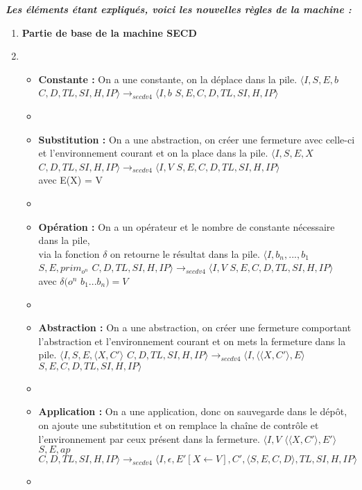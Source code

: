 \documentclass[10pt,a4paper]{article}
\begin{document}
				\textbf{\textit{Les éléments étant expliqués, voici les nouvelles règles de la machine :}}
				\smallbreak
				\begin{enumerate}
					\item[] \textbf{Partie de base de la machine SECD} 
					\item[]
					\begin{itemize}
						\item[] \textbf{Constante :} On a une constante, on la déplace dans la pile.
						\smallbreak
						$\langle I,S,E,b$ $C,D,TL,SI,H,IP\rangle 
						\longrightarrow_{secdv4} \langle I,b$ $S,E,C,D,TL,SI,H,IP\rangle$
						\item[]
							
						\item[] \textbf{Substitution :} On a une abstraction, on créer une fermeture avec celle-ci et l'environnement courant et on la place dans la pile.
						\smallbreak
						$\langle I,S,E,X$ $C,D,TL,SI,H,IP\rangle
						\longrightarrow_{secdv4} \langle I,V$ $S,E,C,D,TL,SI,H,IP\rangle$\\ avec E(X) = V
						\item[]
							
						\item[] \textbf{Opération :} On a un opérateur et le nombre de constante nécessaire dans la pile, \\via la fonction $\delta$ on retourne le résultat dans la pile.
						\smallbreak
						$\langle I,b_{n},...,b_{1}$ $S,E,prim_{o^{n}}$ $C,D,TL,SI,H,IP\rangle
						\longrightarrow_{secdv4} \langle I,V$ $S,E,C,D,TL,SI,H,IP\rangle$
						\\avec $\delta(o^{n}$ $b_{1}...b_{n}) = V$
						\item[]
							
						\item[]  \textbf{Abstraction :} On a une abstraction, on créer une fermeture comportant l'abstraction et l'environnement courant et on mets la fermeture dans la pile.
						\smallbreak
						$\langle I,S,E,\langle X,C'\rangle$ $C,D,TL,SI,H,IP\rangle
						\longrightarrow_{secdv4} \langle I,\langle\langle X,C'\rangle,E\rangle$ $S,E,C,D,TL,SI,H,IP\rangle$
						\item[]
							
						\item[]  \textbf{Application :} On a une application, donc on sauvegarde dans le dépôt, on ajoute une substitution et on remplace la chaîne de contrôle et l'environnement par ceux présent dans la fermeture.
						\smallbreak
						$\langle I,V$ $\langle\langle X,C'\rangle,E'\rangle$ $S,E,ap$ $C,D,TL,SI,H,IP\rangle
						\longrightarrow_{secdv4} \langle I,\epsilon,E'[X \leftarrow V],C',\langle S,E,C,D\rangle,TL,SI,H,IP\rangle$
						\item[] 
							

\end{itemize}
\end{enumerate}
\end{document}
